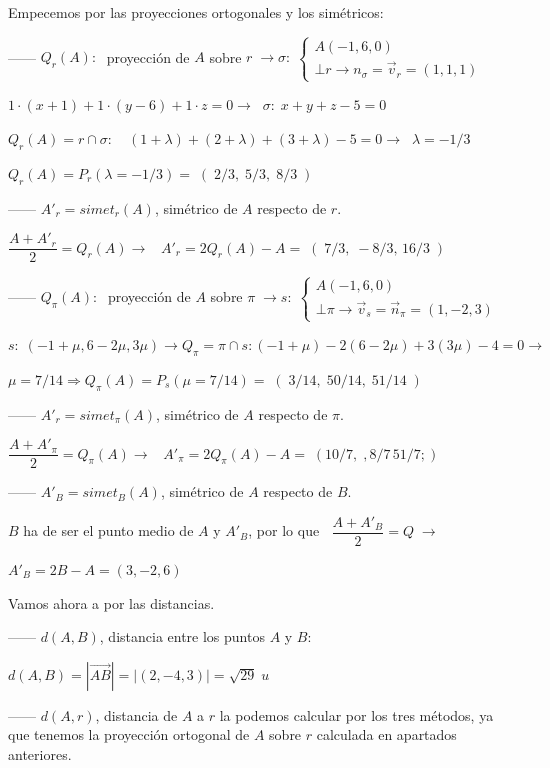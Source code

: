 Empecemos por las proyecciones ortogonales y los simétricos:

\noindent ------ $Q_r(A):\;$ proyección de $A$ sobre $r \; \to \sigma:\; \begin{cases} A(-1,6,0) \\ \bot r \to n_{\sigma}=\vec v_r=(1,1,1) \end{cases} $ 

\noindent $1\cdot (x+1) + 1\cdot (y-6) + 1\cdot z =0 \to \;\;\sigma:\; x+y+z-5=0$

\noindent $Q_r(A)=r\cap \sigma:\quad (1+\lambda)+(2+\lambda)+(3+\lambda)-5=0 \to \;\; \lambda=-1/3$

\noindent $Q_r(A)=P_r(\lambda=-1/3)=\;(\;2/3,\;5/3,\;8/3\;)$

\noindent ------ $A'_r=simet_r(A)$, simétrico de $A$ respecto de $r$.

\noindent $\dfrac {A+A'_r}{2}=Q_r(A) \to \;\;\; A'_r=2Q_r(A)-A=\;(\;7/3,\;-8/3,\,16/3\;)$

\noindent ------ $Q_{\pi}(A):\;$ proyección de $A$ sobre $\pi \; \to s:\; \begin{cases} A(-1,6,0) \\ \bot \pi \to \vec v_s=\vec n_{\pi}=(1,-2,3) \end{cases} $

\noindent $s:\; (-1+\mu,6-2\mu,3\mu) \to Q_{\pi}=\pi\cap s:(-1+\mu)-2(6-2\mu)+3(3\mu)-4=0\to$

\noindent $\mu=7/14 \Rightarrow Q_{\pi}(A)=P_s(\mu=7/14)=\;(\;3/14,\;50/14,\;51/14\;)$

\noindent ------ $A'_r=simet_{\pi}(A)$, simétrico de $A$ respecto de $\pi$.

\noindent $\dfrac {A+A'_{\pi}}{2}=Q_{\pi}(A) \to \;\;\; A'_{\pi}=2Q_{\pi}(A)-A=\;(10/7,\;,8/7\,51/7;)$

\noindent ------ $A'_B=simet_B(A)$, simétrico de $A$ respecto de $B$.

\noindent $B$ ha de ser el punto medio de $A$ y $A'_B$, por lo que $\;\;\dfrac {A+A'_B}{2}=Q \; \to$

\noindent $ A'_B=2B-A=(3,-2,6)$

\noindent Vamos ahora a por las distancias.

\noindent ------ $d(A,B)$, distancia entre los puntos $A$ y $B$:

\noindent $d(A,B)=|\overrightarrow{AB}|=|(2,-4,3)|=\sqrt{29}\; u$

\noindent ------ $d(A,r)$, distancia de $A$ a $r$ la podemos calcular por los tres métodos, ya que tenemos la proyección ortogonal de $A$ sobre $r$ calculada en apartados anteriores.

